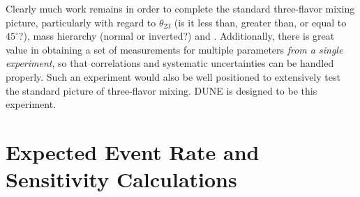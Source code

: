 % 
%

Clearly much work remains in order to complete the standard three-flavor 
mixing picture, particularly 
with regard to $\theta_{23}$ (is it less than, greater than, or equal
to $45^\circ$?), mass hierarchy (normal or inverted?) 
and \deltacp. %
Additionally, there is 
great value in obtaining a set of measurements for multiple parameters 
\emph{from a single experiment}, so that correlations and systematic 
uncertainties can be handled properly.  Such an experiment would also be 
well positioned to extensively test the standard picture of three-flavor mixing.  
DUNE is designed to be this experiment.

\section{Expected Event Rate and Sensitivity Calculations}

